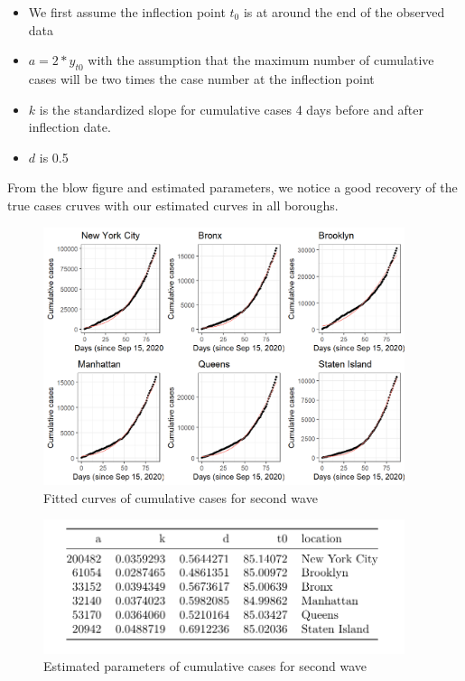 \documentclass[
]{article}
\providecommand{\tightlist}{%
  \setlength{\itemsep}{0pt}\setlength{\parskip}{0pt}}
\begin{document}
\begin{itemize}
\tightlist
\item
  We first assume the inflection point \(t_0\) is at around the end of
  the observed data
\item
  \(a = 2*y_{t0}\) with the assumption that the maximum number of
  cumulative cases will be two times the case number at the inflection
  point
\item
  \(k\) is the standardized slope for cumulative cases 4 days before and
  after inflection date.
\item
  \(d\) is 0.5
\end{itemize}

From the blow figure and estimated parameters, we notice a good recovery
of the true cases cruves with our estimated curves in all boroughs.

\begin{figure}
\centering
\includegraphics[width=4.16667in,height=\textheight]{plots/case_plots/no_start_curve/wave2_all.png}
\caption{Fitted curves of cumulative cases for second wave}
\end{figure}

\begin{figure}
\centering
\includegraphics[width=4.16667in,height=\textheight]{plots/case_plots/predictive/case_final_parameters.png}
\caption{Estimated parameters of cumulative cases for second wave}
\end{figure}
\end{document}
